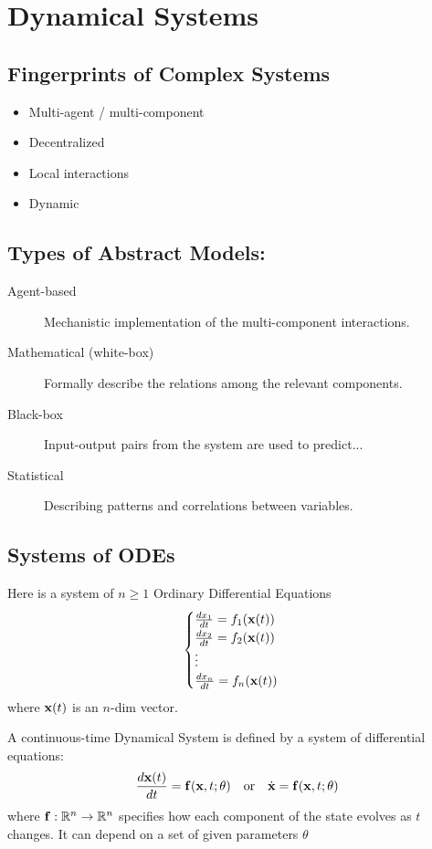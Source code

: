\chapter*{Dynamical Systems}

\section*{Fingerprints of Complex Systems}

\begin{itemize}
    \item Multi-agent / multi-component
    \item Decentralized
    \item Local interactions
    \item Dynamic
\end{itemize}

\section*{Types of Abstract Models:}

\begin{description}
    \item[Agent-based] Mechanistic implementation of the multi-component interactions.
    \item[Mathematical (white-box)] Formally describe the relations among the relevant components.
    \item[Black-box] Input-output pairs from the system are used to predict...
    \item[Statistical] Describing patterns and correlations between variables.
\end{description}

\section*{Systems of ODEs}

Here is a system of $n \ge 1$ Ordinary Differential Equations
\[
\begin{cases}
\frac{dx_1}{dt} = f_1(\mathbf{x}(t))\\
\frac{dx_2}{dt} = f_2(\mathbf{x}(t))\\
\vdots \\
\frac{dx_n}{dt} = f_n(\mathbf{x}(t))
\end{cases}
\]
where $\mathbf{x}(t)$ is an $n$-dim vector.


A continuous-time Dynamical System is defined by a system of differential equations:
\[
\frac{d\mathbf{x}(t)}{dt} = \mathbf{f}(\mathbf{x}, t; \theta) \quad \text{or} \quad \dot{\mathbf{x}} = \mathbf{f}(\mathbf{x}, t; \theta)
\]
where $\mathbf{f}: \mathbb{R}^n \to \mathbb{R}^n$ specifies how each component of the state evolves as $t$ changes.
It can depend on a set of given parameters $\theta$

